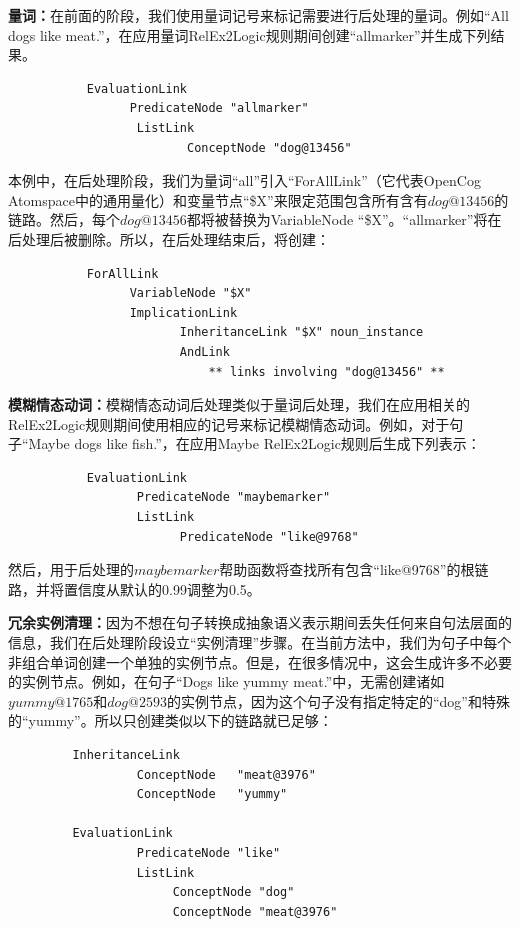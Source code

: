 {\bf 量词：}在前面的阶段，我们使用量词记号来标记需要进行后处理的量词。例如“All dogs like meat.”，在应用量词RelEx2Logic规则期间创建“allmarker”并生成下列结果。

\begin{verbatim}
           EvaluationLink
                 PredicateNode "allmarker"
                  ListLink
                         ConceptNode "dog@13456"
\end{verbatim}

本例中，在后处理阶段，我们为量词“all”引入“ForAllLink”（它代表OpenCog Atomspace中的通用量化）和变量节点“\$X”来限定范围包含所有含有$dog@13456$的链路。然后，每个$dog@13456$都将被替换为VariableNode “\$X”。“allmarker”将在后处理后被删除。所以，在后处理结束后，将创建：

\begin{verbatim}
           ForAllLink
                 VariableNode "$X"
                 ImplicationLink 
                        InheritanceLink "$X" noun_instance
                        AndLink
                            ** links involving "dog@13456" **
\end{verbatim}

{\bf 模糊情态动词：}模糊情态动词后处理类似于量词后处理，我们在应用相关的RelEx2Logic规则期间使用相应的记号来标记模糊情态动词。例如，对于句子“Maybe dogs like fish.”，在应用Maybe RelEx2Logic规则后生成下列表示：

\begin{verbatim}
           EvaluationLink
                  PredicateNode "maybemarker"
                  ListLink
                        PredicateNode "like@9768"
\end{verbatim}

然后，用于后处理的$maybemarker$帮助函数将查找所有包含“like@9768”的根链路，并将置信度从默认的0.99调整为0.5。

{\bf 冗余实例清理：}因为不想在句子转换成抽象语义表示期间丢失任何来自句法层面的信息，我们在后处理阶段设立“实例清理”步骤。在当前方法中，我们为句子中每个非组合单词创建一个单独的实例节点。但是，在很多情况中，这会生成许多不必要的实例节点。例如，在句子“Dogs like yummy meat.”中，无需创建诸如$yummy@1765$和$dog@2593$的实例节点，因为这个句子没有指定特定的“dog”和特殊的“yummy”。所以只创建类似以下的链路就已足够：

\begin{verbatim}
         InheritanceLink 
                  ConceptNode   "meat@3976" 
                  ConceptNode   "yummy"

         EvaluationLink 
                  PredicateNode "like"
                  ListLink
                       ConceptNode "dog"
                       ConceptNode "meat@3976"
\end{verbatim}

